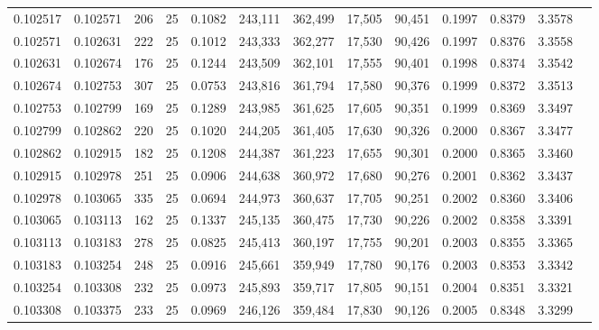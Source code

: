 \begin{tabular}{rrrrrrrrrrrrr}
0.102517 & 0.102571 &   206 &  25 &                                     0.1082 & 243,111 & 362,499 &  17,505 &  90,451 & 0.1997 & 0.8379 & 3.3578 \\
0.102571 & 0.102631 &   222 &  25 &                                     0.1012 & 243,333 & 362,277 &  17,530 &  90,426 & 0.1997 & 0.8376 & 3.3558 \\
0.102631 & 0.102674 &   176 &  25 &                                     0.1244 & 243,509 & 362,101 &  17,555 &  90,401 & 0.1998 & 0.8374 & 3.3542 \\
0.102674 & 0.102753 &   307 &  25 &                                     0.0753 & 243,816 & 361,794 &  17,580 &  90,376 & 0.1999 & 0.8372 & 3.3513 \\
0.102753 & 0.102799 &   169 &  25 &                                     0.1289 & 243,985 & 361,625 &  17,605 &  90,351 & 0.1999 & 0.8369 & 3.3497 \\
0.102799 & 0.102862 &   220 &  25 &                                     0.1020 & 244,205 & 361,405 &  17,630 &  90,326 & 0.2000 & 0.8367 & 3.3477 \\
0.102862 & 0.102915 &   182 &  25 &                                     0.1208 & 244,387 & 361,223 &  17,655 &  90,301 & 0.2000 & 0.8365 & 3.3460 \\
0.102915 & 0.102978 &   251 &  25 &                                     0.0906 & 244,638 & 360,972 &  17,680 &  90,276 & 0.2001 & 0.8362 & 3.3437 \\
0.102978 & 0.103065 &   335 &  25 &                                     0.0694 & 244,973 & 360,637 &  17,705 &  90,251 & 0.2002 & 0.8360 & 3.3406 \\
0.103065 & 0.103113 &   162 &  25 &                                     0.1337 & 245,135 & 360,475 &  17,730 &  90,226 & 0.2002 & 0.8358 & 3.3391 \\
0.103113 & 0.103183 &   278 &  25 &                                     0.0825 & 245,413 & 360,197 &  17,755 &  90,201 & 0.2003 & 0.8355 & 3.3365 \\
0.103183 & 0.103254 &   248 &  25 &                                     0.0916 & 245,661 & 359,949 &  17,780 &  90,176 & 0.2003 & 0.8353 & 3.3342 \\
0.103254 & 0.103308 &   232 &  25 &                                     0.0973 & 245,893 & 359,717 &  17,805 &  90,151 & 0.2004 & 0.8351 & 3.3321 \\
0.103308 & 0.103375 &   233 &  25 &                                     0.0969 & 246,126 & 359,484 &  17,830 &  90,126 & 0.2005 & 0.8348 & 3.3299 \\

\end{tabular}
